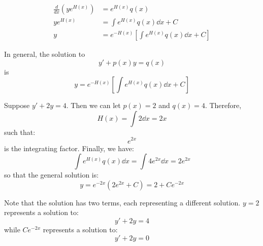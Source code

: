 \begin{itemize}
    \begin{align}
        \frac{d}{dx}(ye^{H(x)}) &= e^{H(x)}q(x) \\ 
        ye^{H(x)} &= \int e^{H(x)}q(x) \dd{x} + C \\ 
        y &= e^{-H(x)}\left[\int e^{H(x)}q(x) \dd{x} + C\right]
    \end{align}
    \begin{idea}
        In general, the solution to
        \begin{equation}
            y' + p(x)y = q(x)
            \label{eq:}
        \end{equation}
        is
        \begin{equation}
            y = e^{-H(x)}\left[\int e^{H(x)}q(x) \dd{x} + C\right]
            \label{eq:}
        \end{equation}
    \end{idea}
    \begin{example}
        Suppose $y'+2y=4$. Then we can let $p(x)=2$ and $q(x)=4$. Therefore,
        \begin{equation}
            H(x) = \int 2 \dd{x} = 2x
            \label{eq:}
        \end{equation}
        such that:
        \begin{equation}
            e^{2x}
            \label{eq:}
        \end{equation}
        is the integrating factor. Finally, we have:
        \begin{equation}
            \int e^{H(x)}q(x)\dd{x} = \int 4e^{2x} \dd{x} = 2e^{2x}
            \label{eq:}
        \end{equation}
        so that the general solution is:
        \begin{equation}
            y = e^{-2x}\left(2e^{2x}+C\right) = 2 + Ce^{-2x}
            \label{eq:}
        \end{equation}
    \end{example}
    \begin{idea}
        Note that the solution has two terms, each representing a different solution. $y=2$ represents a solution to:
        \begin{equation}
            y' + 2y = 4
            \label{eq:}
        \end{equation}
        while $Ce^{-2x}$ represents a solution to:
        \begin{equation}
            y' + 2y = 0
            \label{eq:}
        \end{equation}

\end{idea}
\end{itemize}

